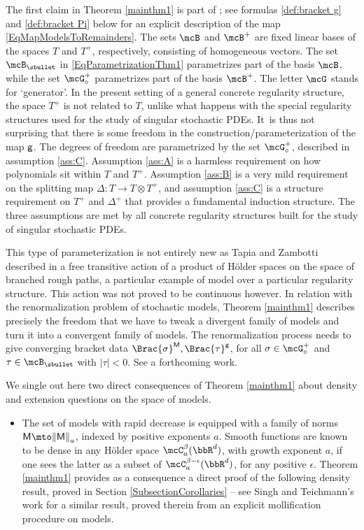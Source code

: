 The first claim in Theorem \ref{mainthm1} is part of \cite[Th.\,21]{BH}; see formulas \eqref{def:bracket g} and \eqref{def:bracket Pi} below for an explicit description of the map \eqref{EqMapModelsToRemainders}. The sets $\mcB$ and $\mcB^+$ are fixed linear bases of the spaces $T$ and $T^+$, respectively, consisting of homogeneous vectors. The set $\mcB_\sbullet$ in \eqref{EqParametrizationThm1} parametrizes part of the basis $\mcB$, while the set $\mcG_\circ^+$ parametrizes part of the basis $\mcB^+$. The letter $\mcG$ stands for `generator'. In the present setting of a general concrete regularity structure, the space $T^+$ is not related to $T$, unlike what happens with the special regularity structures used for the study of singular stochastic PDEs. It~is thus not surprising that there is some freedom in the construction/parameterization of the map $\sf g$. The degrees of freedom are parametrized by the set $\mcG^+_\circ$, described in assumption \eqref{ass:C}. Assumption \eqref{ass:A} is a harmless requirement on how polynomials sit within $T$ and $T^+$. Assumption \eqref{ass:B} is a very mild requirement on the splitting map $\Delta : T\to T\otimes T^+$, and assumption \eqref{ass:C} is a structure requirement on $T^+$ and $\Delta^+$ that provides a fundamental induction structure. The three assumptions are met by all concrete regularity structures built for the study of singular stochastic PDEs.

This type of parameterization is not entirely new as Tapia and Zambotti described in \cite{TZ18} a free transitive action of a product of Hölder spaces on the space of branched rough paths, a particular example of model over a particular regularity structure. This action was not proved to be continuous however. In relation with the renormalization problem of stochastic models, Theorem \ref{mainthm1} describes precisely the freedom that we have to tweak a divergent family of models and turn it into a convergent family of models. The renormalization process needs to give converging bracket data $\Brac{\sigma}^{\sf M}, \Brac{\tau}^{\sf g}$, for all $\sigma\in\mcG_\circ^+$ and $\tau\in\mcB_\sbullet$ with $\vert\tau\vert<0$. See a forthcoming work.

We single out here two direct consequences of Theorem \ref{mainthm1} about density and extension questions on the space of models.

\begin{itemize}
\item
The set of models with rapid decrease is equipped with a family of norms ${\sf M\mto \|M\|}_a$, indexed by positive exponents $a$. Smooth functions are known to be dense in any Hölder space $\mcC^\beta_a(\bbR^d)$, with growth exponent $a$, if one sees the latter as a subset of $\mcC^{\beta-\epsilon}_a(\bbR^d)$, for any positive $\epsilon$. Theorem \ref{mainthm1} provides as a consequence a direct proof of the following density result, proved in Section \ref{SubsectionCorollaries} -- see Singh and Teichmann's work \cite{SinghTeichmann} for a similar result, proved therein from an explicit mollification procedure on models.
\end{itemize}

